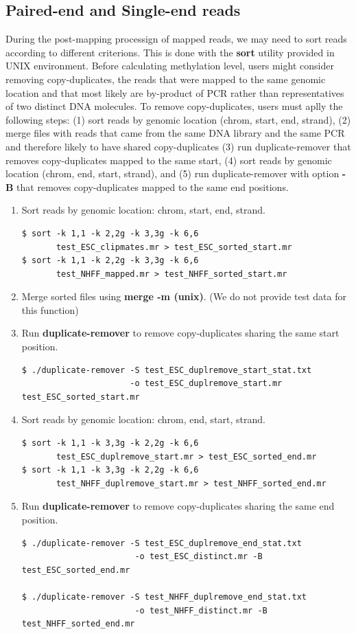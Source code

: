 \documentclass{article}
\begin{document}
\subsection{Paired-end and Single-end reads}
\label{sec:paired_single_reads}
During the post-mapping processign of mapped reads, we may need to
sort reads according to different criterions. This is done with the
\textbf{sort} utility provided in UNIX environment. 
Before calculating methylation level, users might consider removing
copy-duplicates, the reads that were mapped to the same genomic location and
 that most likely are by-product of PCR rather than representatives of 
two distinct DNA molecules. To remove copy-duplicates, users must aplly the following
steps: (1) sort reads by genomic location (chrom, start, end, strand), 
(2) merge files with reads that came from the same DNA library and the same PCR
and therefore likely to have shared copy-duplicates (3) run duplicate-remover 
that removes copy-duplicates mapped to the same start, (4)
sort reads by genomic location (chrom, end, start, strand), and (5)
run duplicate-remover with option \textbf{-B} that removes copy-duplicates
mapped to the same end positions. 

\begin{enumerate}
\item
Sort reads by genomic location: chrom, start, end, strand.
\begin{verbatim}
$ sort -k 1,1 -k 2,2g -k 3,3g -k 6,6 
       test_ESC_clipmates.mr > test_ESC_sorted_start.mr
$ sort -k 1,1 -k 2,2g -k 3,3g -k 6,6 
       test_NHFF_mapped.mr > test_NHFF_sorted_start.mr
\end{verbatim}
\item
Merge sorted files using \textbf{merge -m (unix)}. (We do not provide test data for this 
function)
\item
Run \textbf{duplicate-remover} to remove copy-duplicates sharing the same start position.
\begin{verbatim}
$ ./duplicate-remover -S test_ESC_duplremove_start_stat.txt
                      -o test_ESC_duplremove_start.mr  test_ESC_sorted_start.mr
\end{verbatim}
\item
Sort reads by genomic location: chrom, end, start, strand.
\begin{verbatim}
$ sort -k 1,1 -k 3,3g -k 2,2g -k 6,6 
       test_ESC_duplremove_start.mr > test_ESC_sorted_end.mr
$ sort -k 1,1 -k 3,3g -k 2,2g -k 6,6 
       test_NHFF_duplremove_start.mr > test_NHFF_sorted_end.mr
\end{verbatim}
\item
Run \textbf{duplicate-remover} to remove copy-duplicates sharing the same end position.
\begin{verbatim}
$ ./duplicate-remover -S test_ESC_duplremove_end_stat.txt
                       -o test_ESC_distinct.mr -B test_ESC_sorted_end.mr

$ ./duplicate-remover -S test_NHFF_duplremove_end_stat.txt
                       -o test_NHFF_distinct.mr -B test_NHFF_sorted_end.mr
\end{verbatim}
\end{enumerate}
\end{document}
